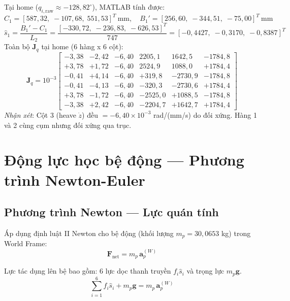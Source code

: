 \documentclass[12pt,a4paper]{article}
\newcommand{\Jq}{\mathbf{J}_q}
\newcommand{\Fv}{\mathbf{F}}
\newcommand{\shat}{\hat{s}}
\newcommand{\ap}{\mathbf{a}_p}
\newcommand{\gv}{\mathbf{g}}
\begin{document}
\begin{numbox}[frametitle={Jacobian tại home --- giá trị MATLAB}]
Tại home ($q_{i,\text{raw}} \approx -128{,}82^{\circ}$), MATLAB tính được:
\[
  C_1 = [587{,}32{,}\;-107{,}68{,}\;551{,}53]^T\ \text{mm},\quad
  B_1' = [256{,}60{,}\;-344{,}51{,}\;-75{,}00]^T\ \text{mm}
\]
\[
  \shat_1 = \frac{B_1'-C_1}{L_2} = \frac{[-330{,}72{,}\;-236{,}83{,}\;-626{,}53]^T}{747}
           = [-0{,}4427{,}\;-0{,}3170{,}\;-0{,}8387]^T
\]
Toàn bộ $\Jq$ tại home (6 hàng x 6 cột):
\[
  \Jq = 10^{-3}\!\begin{bmatrix}
  -3{,}38 & -2{,}42 & -6{,}40 & 2205{,}1 & 1642{,}5 & -1784{,}8 \\
  +3{,}78 & +1{,}72 & -6{,}40 & 2524{,}9 & 1088{,}0 & +1784{,}4 \\
  -0{,}41 & +4{,}14 & -6{,}40 & +319{,}8 & -2730{,}9 & -1784{,}8 \\
  -0{,}41 & -4{,}13 & -6{,}40 & -320{,}3 & -2730{,}6 & +1784{,}4 \\
  +3{,}78 & -1{,}72 & -6{,}40 & -2525{,}0 & +1088{,}5 & -1784{,}8 \\
  -3{,}38 & +2{,}42 & -6{,}40 & -2204{,}7 & +1642{,}7 & +1784{,}4
  \end{bmatrix}
\]
\textit{Nhận xét}: Cột 3 (heave $\dot z$) đều $= -6{,}40\times10^{-3}$ rad/(mm/s)
do đối xứng. Hàng 1 và 2 cùng cụm nhưng đối xứng qua trục.
\end{numbox}

\section{Động lực học bệ động --- Phương trình Newton-Euler}

\subsection{Phương trình Newton --- Lực quán tính}

Áp dụng định luật II Newton cho bệ động (khối lượng $m_p = 30{,}0653$ kg) trong World Frame:
\begin{equation}
  \Fv_{\text{net}} = m_p\,\ap^{(W)}
  \label{eq:Newton_raw}
\end{equation}

Lực tác dụng lên bệ bao gồm: 6 lực dọc thanh truyền $f_i\shat_i$ và trọng lực $m_p\gv$.
\begin{equation}
  \sum_{i=1}^{6}f_i\shat_i + m_p\gv = m_p\,\ap^{(W)}
\end{equation}
\end{document}
